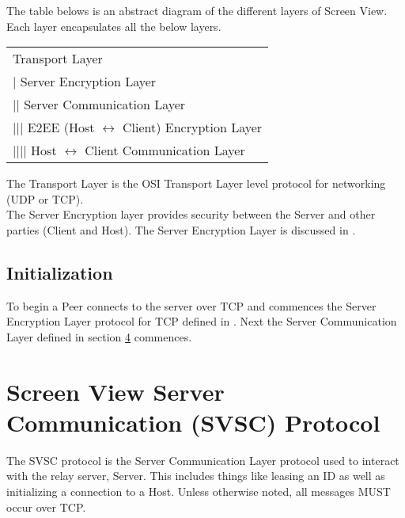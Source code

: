 \documentclass{article}
\newcommand{\projectName}{Screen View}
\begin{document}
    The table belows is an abstract diagram of the different layers of \projectName. Each layer encapsulates all the
    below layers.

    \begin{center}
        \begin{tabular}{|l|}
            \hline
            Transport Layer                                           \\
            | Server Encryption Layer                                 \\
            || Server Communication Layer                             \\
            ||| E2EE (Host $\leftrightarrow$ Client) Encryption Layer \\
            |||| Host $\leftrightarrow$ Client Communication Layer    \\
            \hline
        \end{tabular}
    \end{center}

    The Transport Layer is the OSI Transport Layer level protocol for networking (UDP or TCP). \\

    The Server Encryption layer provides security between the Server and other parties (Client and Host). The Server
    Encryption Layer is discussed in %
    .

    \subsection{Initialization}

    To begin a Peer connects to the server over TCP and commences the Server Encryption Layer protocol for TCP
    defined in %
    . Next the Server Communication Layer defined in section \hyperlink{section.4}{4} commences.

    \newpage


    \section{Screen View Server Communication (SVSC) Protocol }

    The SVSC protocol is the Server Communication Layer protocol used to interact with the relay server, Server. This
    includes things like leasing an ID as well as initializing a connection to a Host. Unless otherwise noted, all
    messages MUST occur over TCP.\\
\end{document}
